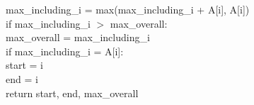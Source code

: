 \documentclass{article}
\begin{document}
\begin{enumerate}
	\hspace*{0.5 in} max\_including\_i = max(max\_including\_i + A[i], A[i]) \\
	\hspace*{0.5 in} if max\_including\_i $>$ max\_overall: \\
	\hspace*{1.0 in} 	max\_overall = max\_including\_i \\
	\hspace*{1.0 in}	if max\_including\_i = A[i]: \\
	\hspace*{1.5 in}		start = i \\
	\hspace*{1.0 in}	end = i \\
	return start, end, max\_overall \\
	

\end{enumerate}
\end{document}
